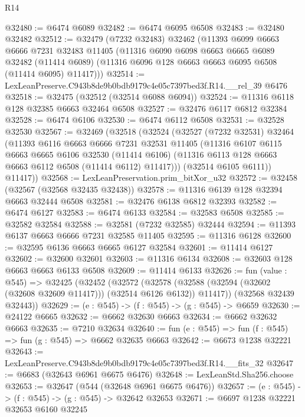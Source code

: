 \begin{lexlean}{R14}
\begin{coremodule}
@32480 := @6474 @6089
@32482 := @6474 @6095 @6508
@32483 := @32480 @32482
@32512 := @32479
    (@7232 @32483)
    @32462
    (@11393
      @6099
      @6663
      @6666
      @7231
      @32483
      @11405
      (@11316
        @6090
        @6098
        @6663
        @6665
        @6089
        @32482
        (@11414 @6089)
        (@11316 @6096 @128 @6663 @6663 @6095 @6508 (@11414 @6095) @11417)))
@32514 := LexLeanPreserve.C943b8de9b0bdb9179c4e05c7397bed3f.R14.__rel_39 @6476
@32518 := @32475 (@32512 (@32514 @6088 @6094))
@32524 := @11316 @6118 @128 @32385 @6663 @32464 @6508
@32527 := @32476 @6117 @6812 @32384
@32528 := @6474 @6106
@32530 := @6474 @6112 @6508
@32531 := @32528 @32530
@32567 := @32469
    (@32518
      (@32524
        (@32527
          (@7232 @32531)
          @32464
          (@11393
            @6116
            @6663
            @6666
            @7231
            @32531
            @11405
            (@11316
              @6107
              @6115
              @6663
              @6665
              @6106
              @32530
              (@11414 @6106)
              (@11316 @6113 @128 @6663 @6663 @6112 @6508 (@11414 @6112) @11417)))
          (@32514 @6105 @6111))
        @11417))
@32568 := LexLeanPreservation.prim_bitXor_u32
@32572 := @32458 (@32567 (@32568 @32435 @32438))
@32578 := @11316 @6139 @128 @32394 @6663 @32444 @6508
@32581 := @32476 @6138 @6812 @32393
@32582 := @6474 @6127
@32583 := @6474 @6133
@32584 := @32583 @6508
@32585 := @32582 @32584
@32588 := @32581 (@7232 @32585) @32444
@32594 := @11393 @6137 @6663 @6666 @7231 @32585 @11405
@32595 := @11316 @6128
@32600 := @32595 @6136 @6663 @6665 @6127 @32584
@32601 := @11414 @6127
@32602 := @32600 @32601
@32603 := @11316 @6134
@32608 := @32603 @128 @6663 @6663 @6133 @6508
@32609 := @11414 @6133
@32626 := fun (value : @545) =>
  @32425
    (@32452
      (@32572
        (@32578 (@32588 (@32594 (@32602 (@32608 @32609 @11417))) (@32514 @6126 @6132)) @11417))
      (@32568 @32439 @32443))
@32629 := (e : @545) -> (f : @545) -> (g : @545) -> @6659
@32630 := @24122 @6665
@32632 := @6662 @32630 @6663
@32634 := @6662 @32632 @6663
@32635 := @7210 @32634
@32640 := fun (e : @545) => fun (f : @545) => fun (g : @545) => @6662 @32635 @6663
@32642 := @6673 @1238 @32221
@32643 := LexLeanPreserve.C943b8de9b0bdb9179c4e05c7397bed3f.R14.__fits_32
@32647 := @6683 (@32643 @6961 @6675 @6476)
@32648 := LexLeanStd.Sha256.choose
@32653 := @32647 (@544 (@32648 @6961 @6675 @6476))
@32657 := (e : @545) -> (f : @545) -> (g : @545) -> @32642 @32653
@32671 := @6697
    @1238
    @32221
    @32653
    @6160
    @32245

\end{coremodule}
\end{lexlean}

